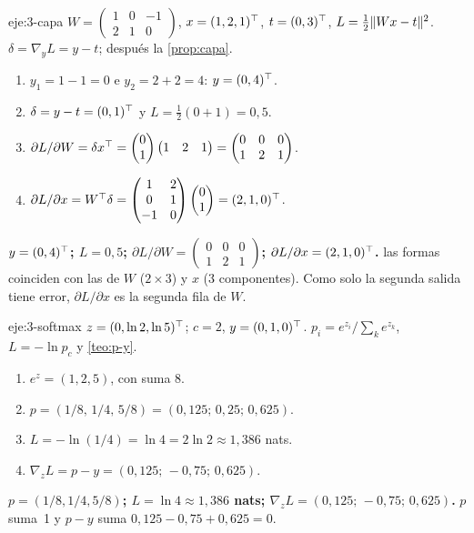 \begin{solucion}{eje:3-capa}
\datos $W=\begin{pmatrix}1&0&-1\\2&1&0\end{pmatrix}$, $x=(1,2,1)^{\top}$, $t=(0,3)^{\top}$, $L=\tfrac12\lVert Wx-t\rVert^{2}$.
\planteamiento $\delta=\nabla_y L=y-t$; después la \cref{prop:capa}.
\pasos
\begin{enumerate}[label=\arabic*.]
  \item $y_1=1-1=0$ e $y_2=2+2=4$: $y=(0,4)^{\top}$.
  \item $\delta=y-t=(0,1)^{\top}$ y $L=\tfrac12(0+1)=0{,}5$.
  \item $\partial L/\partial W=\delta x^{\top}=\begin{pmatrix}0\\1\end{pmatrix}\begin{pmatrix}1&2&1\end{pmatrix}=\begin{pmatrix}0&0&0\\1&2&1\end{pmatrix}$.
  \item $\partial L/\partial x=W^{\top}\delta=\begin{pmatrix}1&2\\0&1\\-1&0\end{pmatrix}\begin{pmatrix}0\\1\end{pmatrix}=(2,1,0)^{\top}$.
\end{enumerate}
\resultado \textbf{$y=(0,4)^{\top}$; $L=0{,}5$; $\partial L/\partial W=\begin{pmatrix}0&0&0\\1&2&1\end{pmatrix}$; $\partial L/\partial x=(2,1,0)^{\top}$.}
\comprobacion las formas coinciden con las de $W$ ($2\times 3$) y $x$ (3 componentes). Como solo la segunda salida tiene error, $\partial L/\partial x$ es la segunda fila de $W$.
\end{solucion}

\begin{solucion}{eje:3-softmax}
\datos $z=(0,\ln 2,\ln 5)^{\top}$; $c=2$, $y=(0,1,0)^{\top}$.
\planteamiento $p_i=e^{z_i}/\sum_ke^{z_k}$, $L=-\ln p_c$ y \cref{teo:p-y}.
\pasos
\begin{enumerate}[label=\arabic*.]
  \item $e^{z}=(1,2,5)$, con suma $8$.
  \item $p=(1/8,\,1/4,\,5/8)=(0{,}125;\,0{,}25;\,0{,}625)$.
  \item $L=-\ln(1/4)=\ln 4=2\ln 2\approx 1{,}386$ nats.
  \item $\nabla_zL=p-y=(0{,}125;\,-0{,}75;\,0{,}625)$.
\end{enumerate}
\resultado \textbf{$p=(1/8,1/4,5/8)$; $L=\ln 4\approx 1{,}386$ nats; $\nabla_zL=(0{,}125;\,-0{,}75;\,0{,}625)$.}
\comprobacion $p$ suma~1 y $p-y$ suma $0{,}125-0{,}75+0{,}625=0$.
\end{solucion}

